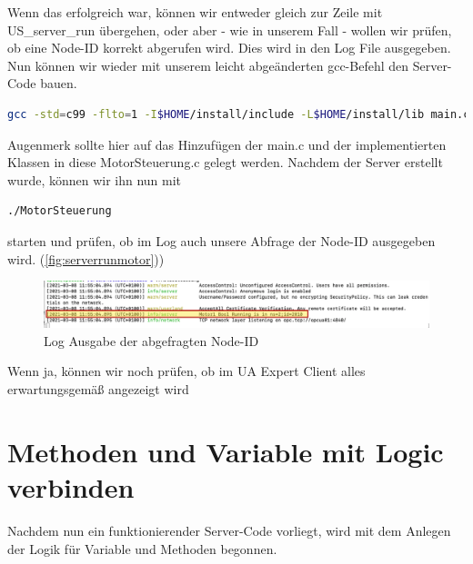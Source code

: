 	Wenn das erfolgreich war, können wir entweder gleich zur Zeile mit US\_server\_run übergehen, oder aber - wie in unserem Fall - wollen wir prüfen, ob eine Node-ID korrekt abgerufen wird. Dies wird in den Log File ausgegeben.
	Nun können wir wieder mit unserem leicht abgeänderten gcc-Befehl den Server-Code bauen.
	\begin{lstlisting}[language=Bash]
	gcc -std=c99 -flto=1 -I$HOME/install/include -L$HOME/install/lib main.c MotorSteuerung.c -lopen62541 -lmbedtls -lmbedx509 -lmbedcrypto -o MotorSteuerung
\end{lstlisting}
	Augenmerk sollte hier auf das Hinzufügen der main.c und der implementierten Klassen in diese MotorSteuerung.c gelegt werden.
	Nachdem der Server erstellt wurde, können wir ihn nun mit
	\begin{lstlisting}[language=Bash]
	./MotorSteuerung
\end{lstlisting}
	starten und prüfen, ob im Log auch unsere Abfrage der Node-ID ausgegeben wird. (\autoref{fig:serverrunmotor}))
\begin{figure}[H]
	\centering
	\includegraphics[width=1\linewidth]{abb/ServerRunMotor}
	\caption{Log Ausgabe der abgefragten Node-ID}
	\label{fig:serverrunmotor}
\end{figure}

Wenn ja, können wir noch prüfen, ob im UA Expert Client alles erwartungsgemäß angezeigt wird
\clearpage
\section{Methoden und Variable mit Logic verbinden}
Nachdem nun ein funktionierender Server-Code vorliegt, wird mit dem Anlegen der Logik für Variable und Methoden begonnen.

